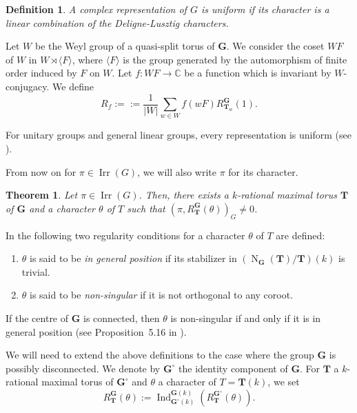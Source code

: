 \documentclass[12pt]{amsart}
\numberwithin{equation}{subsection}
\newtheorem{defn}[equation]{Definition}
\newtheorem{thm}[equation]{Theorem}
\newcommand{\CC}{\mathbb{C}}
\newcommand{\Ind}{\operatorname{Ind}}
\newcommand{\bG}{\mathbf{G}}
\newcommand{\bT}{\mathbf{T}}
\newcommand{\Nor}{\operatorname{N}}
\newcommand{\Irr}{\operatorname{Irr}}
\begin{document}
\begin{defn} \label{defn:uniform}
 {\rm A  complex representation of $G$ is  \textit{uniform} if its character is a linear combination of the Deligne-Lusztig characters.}
\end{defn}

Let $W$ be the Weyl group of a quasi-split torus of $\bG$. We consider the coset $WF$ of $W$ in $W\rtimes\langle F\rangle$, where $\langle F\rangle$ is the group generated by the automorphism of finite order induced by $F$ on $W$.
Let $f\colon WF\to\CC$ be a function which is invariant by $W$-conjugacy. We define
\begin{equation} \label{eqn:Rf}
R_f:= :=\frac{1}{|W|}\sum_{w\in W} f(wF) R^\bG_{\bT_w}(1).
\end{equation}

For unitary groups and general linear groups, every representation is uniform (see \cite[Theorem~11.7.3]{DMbook}). 

From now on for $\pi\in\Irr(G)$, we will also write $\pi$ for its character.

\begin{thm} {\rm \cite[Corollary~7.7]{DL}}
Let $\pi\in\Irr(G)$. Then, there exists a $k$-rational maximal torus $\bT$ of $\bG$ and a character $\theta$ of $T$ such that $(\pi, R_\bT^\bG(\theta))_{G}\ne 0$.
\end{thm}

In \cite{DL} the following two regularity conditions for a character $\theta$ of $T$ are defined:
\begin{enumerate}
\item $\theta$ is said to be \textit{in general position} if its stabilizer in $(\Nor_\bG(\bT)/\bT)(k)$ is trivial. 
\item $\theta$ is said to be \textit{non-singular} if it is not orthogonal to any coroot.
\end{enumerate} 
If the centre of $\bG$ is connected, then $\theta$ is non-singular if and only if it is in general position (see Proposition~5.16 in \cite{DL}).

We will need to extend the above definitions to the case where the group $\bG$ is possibly disconnected. We denote by $\bG^\circ$ the identity component of $\bG$. For $\bT$ a $k$-rational maximal torus of $\bG^\circ$ and $\theta$ a character of $T=\bT(k)$, we set
\begin{equation}
R_{\bT}^{\bG}(\theta):=\Ind_{\bG^{\circ}(k)}^{\bG(k)}(R_{\bT}^{\bG^{\circ}}(\theta)).
\end{equation}
\end{document}
